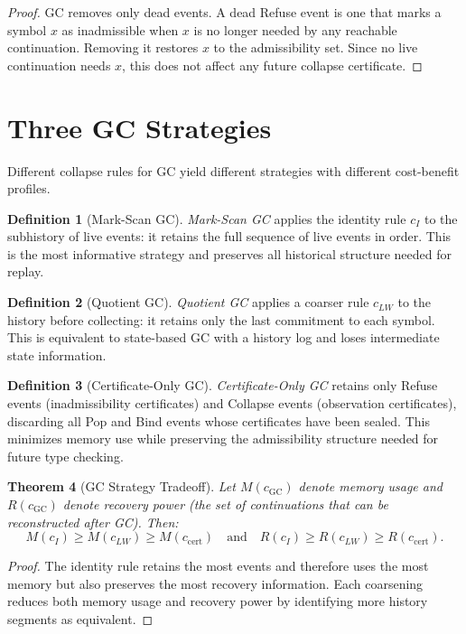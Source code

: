 \documentclass[12pt, a4paper, openany]{book}
\theoremstyle{plain}
\newtheorem{theorem}{Theorem}[chapter]
\theoremstyle{definition}
\newtheorem{definition}[theorem]{Definition}
\theoremstyle{remark}
\begin{document}
\begin{proof}
GC removes only dead events. A dead Refuse event is one that marks a symbol
$x$ as inadmissible when $x$ is no longer needed by any reachable continuation.
Removing it restores $x$ to the admissibility set. Since no live continuation
needs $x$, this does not affect any future collapse certificate.
\end{proof}

\section{Three GC Strategies}

Different collapse rules for GC yield different strategies with different
cost-benefit profiles.

\begin{definition}[Mark-Scan GC]
\emph{Mark-Scan GC} applies the identity rule $c_I$ to the subhistory of live
events: it retains the full sequence of live events in order. This is the most
informative strategy and preserves all historical structure needed for replay.
\end{definition}

\begin{definition}[Quotient GC]
\emph{Quotient GC} applies a coarser rule $c_{LW}$ to the history before
collecting: it retains only the last commitment to each symbol. This is equivalent
to state-based GC with a history log and loses intermediate state information.
\end{definition}

\begin{definition}[Certificate-Only GC]
\emph{Certificate-Only GC} retains only Refuse events (inadmissibility
certificates) and Collapse events (observation certificates), discarding all Pop
and Bind events whose certificates have been sealed. This minimizes memory use
while preserving the admissibility structure needed for future type checking.
\end{definition}

\begin{theorem}[GC Strategy Tradeoff]
Let $M(c_{\mathrm{GC}})$ denote memory usage and $R(c_{\mathrm{GC}})$ denote
recovery power (the set of continuations that can be reconstructed after GC).
Then:
\[
M(c_I) \geq M(c_{LW}) \geq M(c_{\mathrm{cert}})
\quad \text{and} \quad
R(c_I) \geq R(c_{LW}) \geq R(c_{\mathrm{cert}}).
\]
\end{theorem}

\begin{proof}
The identity rule retains the most events and therefore uses the most memory but
also preserves the most recovery information. Each coarsening reduces both memory
usage and recovery power by identifying more history segments as equivalent.
\end{proof}
\end{document}
